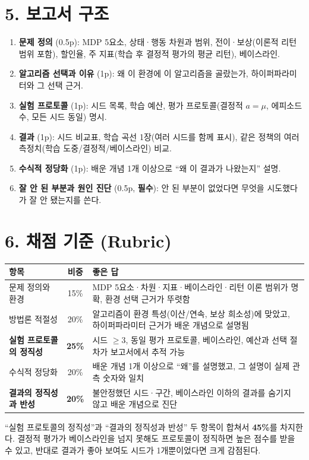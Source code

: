 \documentclass[12pt]{article}
\begin{document}
\newpage
\section*{5. 보고서 구조}
\begin{enumerate}
\item \textbf{문제 정의} (0.5p): MDP 5요소, 상태·행동 차원과 범위,
  전이·보상(이론적 리턴 범위 포함), 할인율, 주 지표(학습 후 결정적
  평가의 평균 리턴), 베이스라인.
\item \textbf{알고리즘 선택과 이유} (1p): 왜 이 환경에 이 알고리즘을
  골랐는가, 하이퍼파라미터와 그 선택 근거.
\item \textbf{실험 프로토콜} (1p): 시드 목록, 학습 예산, 평가
  프로토콜(결정적 $a=\mu$, 에피소드 수, 모든 시드 동일) 명시.
\item \textbf{결과} (1p): 시드 비교표, 학습 곡선 1장(여러 시드를 함께
  표시), 같은 정책의 여러 측정치(학습 도중/결정적/베이스라인) 비교.
\item \textbf{수식적 정당화} (1p): 배운 개념 1개 이상으로 ``왜 이
  결과가 나왔는지'' 설명.
\item \textbf{잘 안 된 부분과 원인 진단} (0.5p, \textbf{필수}): 안 된
  부분이 없었다면 무엇을 시도했다가 잘 안 됐는지를 쓴다.
\end{enumerate}

\section*{6. 채점 기준 (Rubric)}
\begin{center}
\small
\begin{tabular}{@{}lcp{6.8cm}@{}}
\toprule
항목 & 비중 & 좋은 답 \\
\midrule
문제 정의와 환경 & 15\% & MDP 5요소·차원·지표·베이스라인·리턴 이론
범위가 명확, 환경 선택 근거가 뚜렷함 \\
방법론 적절성 & 20\% & 알고리즘이 환경 특성(이산/연속, 보상 희소성)에
맞았고, 하이퍼파라미터 근거가 배운 개념으로 설명됨 \\
\textbf{실험 프로토콜의 정직성} & \textbf{25\%} & 시드 $\ge 3$, 동일
평가 프로토콜, 베이스라인, 예산과 선택 절차가 보고서에서 추적 가능 \\
수식적 정당화 & 20\% & 배운 개념 1개 이상으로 ``왜''를 설명했고, 그
설명이 실제 관측 숫자와 일치 \\
\textbf{결과의 정직성과 반성} & \textbf{20\%} & 불안정했던 시드·구간,
베이스라인 이하의 결과를 숨기지 않고 배운 개념으로 진단 \\
\bottomrule
\end{tabular}
\end{center}
\vspace{4pt}
``실험 프로토콜의 정직성''과 ``결과의 정직성과 반성'' 두 항목이 합쳐서
\textbf{45\%}를 차지한다. 결정적 평가가 베이스라인을 넘지 못해도
프로토콜이 정직하면 높은 점수를 받을 수 있고, 반대로 결과가 좋아
보여도 시드가 1개뿐이었다면 크게 감점된다.
\end{document}
